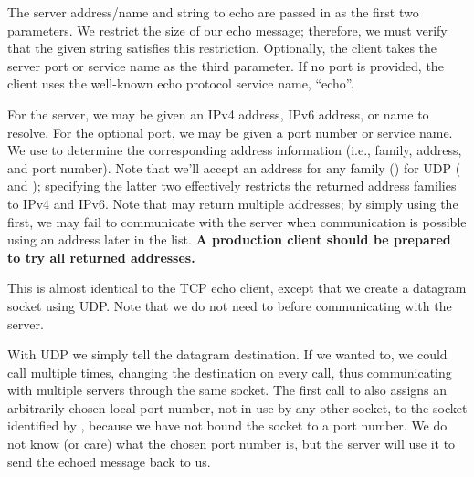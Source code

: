 
\begin{topcode}


The server address/name and string to echo are passed in as the first two
parameters.  We restrict the size of our echo message; therefore, we must
verify that the given string satisfies this restriction.  
Optionally, the client takes the server port or service name as the third
parameter. If no port is provided, the client uses the well-known echo protocol
service name, ``echo''.


For the server, we may be given an IPv4 address, IPv6 address,
or name to resolve.  For the optional port, we may be given a port number or
service name.  We use  to determine the
corresponding address information (i.e., family, address, and port number). 
Note that we'll accept an address for any family () for
UDP ( and ); specifying
the latter two effectively restricts the returned address families
to IPv4 and IPv6. 
Note that  may return multiple addresses;
by simply using the first, we may fail to communicate with the server
when communication is possible using an address later in the list.
\textbf{A production client should be prepared to try all returned addresses.}


This is almost identical to the TCP echo client, except that we
create a datagram socket using UDP.  Note that we do not need to
 before communicating with the server.


With UDP we simply tell  the datagram
destination.  If we wanted to,
we could call  multiple times,
changing the destination on every call, thus communicating with
multiple servers through the same socket.
The first call to  also assigns an
arbitrarily chosen local port number, not in use by any other socket, to the
socket identified by , because we have not bound the socket
to a port number.  We do not know (or care) what the chosen port number
is, but the server will use it to send the echoed message back to us.


\end{topcode}
